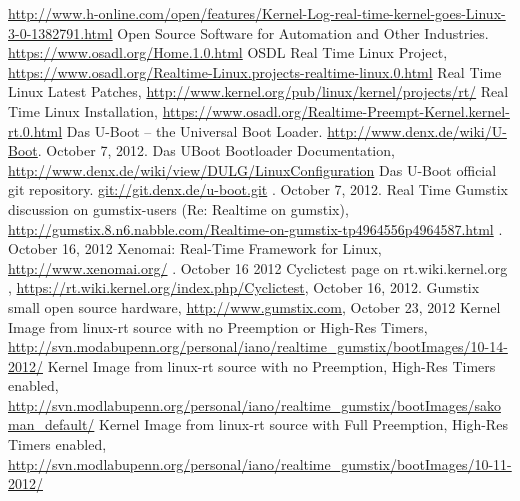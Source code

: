 \begin{thebibliography}{9}
\url{http://www.h-online.com/open/features/Kernel-Log-real-time-kernel-goes-Linux-3-0-1382791.html}
Open Source Software for Automation and Other Industries. \url{https://www.osadl.org/Home.1.0.html}
OSDL Real Time Linux Project, \url{https://www.osadl.org/Realtime-Linux.projects-realtime-linux.0.html}
Real Time Linux Latest Patches, \url{http://www.kernel.org/pub/linux/kernel/projects/rt/}
Real Time Linux Installation, \url{https://www.osadl.org/Realtime-Preempt-Kernel.kernel-rt.0.html}
Das U-Boot -- the Universal Boot Loader. \url{http://www.denx.de/wiki/U-Boot}. October 7, 2012.
Das UBoot Bootloader Documentation, \url{http://www.denx.de/wiki/view/DULG/LinuxConfiguration}
Das U-Boot official git repository. \url{git://git.denx.de/u-boot.git} . October 7, 2012.
Real Time Gumstix discussion on gumstix-users (Re: Realtime on gumstix), \url{http://gumstix.8.n6.nabble.com/Realtime-on-gumstix-tp4964556p4964587.html} . October 16, 2012
Xenomai: Real-Time Framework for Linux, \url{http://www.xenomai.org/} . October 16 2012
Cyclictest page on rt.wiki.kernel.org , \url{https://rt.wiki.kernel.org/index.php/Cyclictest}, October 16, 2012.
Gumstix small open source hardware, \url{http://www.gumstix.com}, October 23, 2012
Kernel Image from linux-rt source with no Preemption or High-Res Timers, \url{http://svn.modabupenn.org/personal/iano/realtime_gumstix/bootImages/10-14-2012/}
Kernel Image from linux-rt source with no Preemption, High-Res Timers enabled, \url{http://svn.modlabupenn.org/personal/iano/realtime_gumstix/bootImages/sakoman_default/}
Kernel Image from linux-rt source with Full Preemption, High-Res Timers enabled, \url{http://svn.modlabupenn.org/personal/iano/realtime_gumstix/bootImages/10-11-2012/}

\end{thebibliography}


